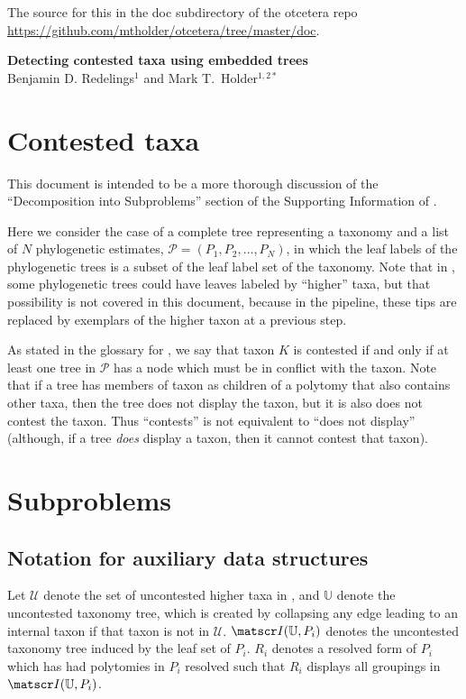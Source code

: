 \documentclass[11pt]{article}
\newcommand{\uncontestedTaxa}{\ensuremath{\mathcal{U}}\xspace}
\begin{document}
The source for this in the doc subdirectory of the otcetera
    repo \url{https://github.com/mtholder/otcetera/tree/master/doc}.
\begin{center}
    {\bf Detecting contested taxa using embedded trees} \\
{Benjamin D. Redelings$^{1}$ and Mark T.~Holder$^{1,2\ast}$}
\end{center}
\tableofcontents
\section{Contested taxa}
This document is intended to be a more thorough discussion of the
    ``Decomposition into Subproblems'' section of the Supporting
    Information of \citep{HinchliffEtAl2015}.

Here we consider the case of a complete tree representing a taxonomy \taxonomy and
    a list of $N$ phylogenetic estimates, $\mathcal{P} = (P_1, P_2, \ldots, P_N)$, in which the leaf labels of the phylogenetic
    trees is a subset of the leaf label set of the taxonomy.
Note that in \citep{HinchliffEtAl2015}, some phylogenetic trees could have leaves labeled by
    ``higher'' taxa, but that possibility is not covered in this document, because in
    the \propinquity pipeline, these tips are replaced by exemplars of the higher taxon
    at a previous step.

As stated in the glossary for \otc, we say that taxon $K$ is contested
    if and only if 
    at least one tree in $\mathcal{P}$ has a node which must be in conflict
    with the taxon.
    Note that if a tree has members of taxon as children of a polytomy that also contains other taxa, then
        the tree does not display the taxon, but it is also does not contest the taxon.
    Thus ``contests'' is not equivalent to ``does not display'' 
    (although, if a tree {\em does} display a taxon, then 
        it cannot contest that taxon).

\section{Subproblems}
\subsection{Notation for auxiliary data structures}
Let $\uncontestedTaxa$ denote the set of uncontested higher taxa in \taxonomy,
    and $\mathbb{U}$ denote the uncontested taxonomy tree,
    which is created by collapsing any edge leading to
    an internal taxon if that taxon is not in $\uncontestedTaxa$.
$\induced{\mathbb{U}}{P_i}$ denotes the uncontested taxonomy tree induced by the leaf set
    of $P_i$.
$R_i$ denotes a resolved form of $P_i$ which has had polytomies in $P_i$ resolved
    such that $R_i$ displays all groupings in $\induced{\mathbb{U}}{P_i}$.
\end{document}
